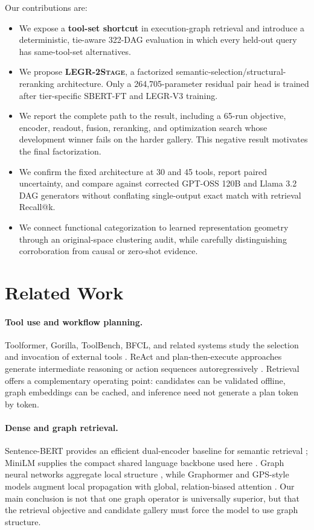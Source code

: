 \documentclass{article}
\newcommand{\method}{\textsc{LEGR-2Stage}}
\newcommand{\sbert}{\textsc{SBERT-FT}}
\newcommand{\vthree}{\textsc{LEGR-V3}}
\begin{document}
Our contributions are:
\begin{itemize}[leftmargin=*]
    \item We expose a \textbf{tool-set shortcut} in execution-graph retrieval and introduce a deterministic, tie-aware 322-DAG evaluation in which every held-out query has same-tool-set alternatives.
    \item We propose \textbf{\method{}}, a factorized semantic-selection/structural-reranking architecture.  Only a 264,705-parameter residual pair head is trained after tier-specific \sbert{} and \vthree{} training.
    \item We report the complete path to the result, including a 65-run objective, encoder, readout, fusion, reranking, and optimization search whose development winner fails on the harder gallery.  This negative result motivates the final factorization.
    \item We confirm the fixed architecture at 30 and 45 tools, report paired uncertainty, and compare against corrected GPT-OSS 120B and Llama 3.2 DAG generators without conflating single-output exact match with retrieval Recall@k.
    \item We connect functional categorization to learned representation geometry through an original-space clustering audit, while carefully distinguishing corroboration from causal or zero-shot evidence.
\end{itemize}

\section{Related Work}

\paragraph{Tool use and workflow planning.}
Toolformer, Gorilla, ToolBench, BFCL, and related systems study the selection and invocation of external tools \cite{schick2023toolformer,patil2023gorilla,qin2023toolllm,yan2024berkeley}.
ReAct and plan-then-execute approaches generate intermediate reasoning or action sequences autoregressively \cite{yao2023react,wang2023plan}.
Retrieval offers a complementary operating point: candidates can be validated offline, graph embeddings can be cached, and inference need not generate a plan token by token.

\paragraph{Dense and graph retrieval.}
Sentence-BERT provides an efficient dual-encoder baseline for semantic retrieval \cite{reimers-gurevych-2019-sentence}; MiniLM supplies the compact shared language backbone used here \cite{wang2020minilm}.
Graph neural networks aggregate local structure \cite{kipf2017semi,hamilton2017inductive,velickovic2018graph,xu2018how}, while Graphormer and GPS-style models augment local propagation with global, relation-biased attention \cite{ying2021transformers,rampasek2022recipe}.
Our main conclusion is not that one graph operator is universally superior, but that the retrieval objective and candidate gallery must force the model to use graph structure.
\end{document}
